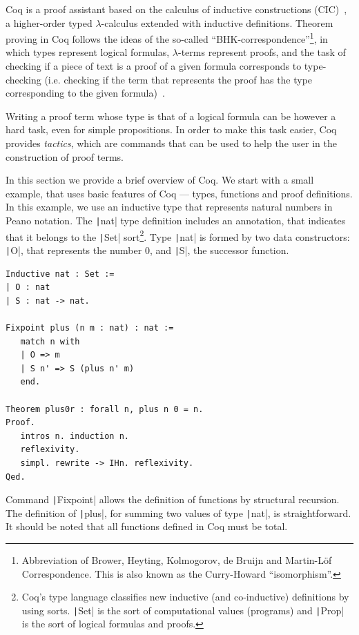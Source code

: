 \documentclass[review]{elsarticle}
\newcommand{\coq}[1]{\texttt|#1|}
\theoremstyle{definition}
\begin{document}
Coq is a proof assistant based on the calculus of inductive
constructions (CIC)~\cite{Bertot2010}, a higher-order typed
$\lambda$-calculus extended with inductive definitions. Theorem
proving in Coq follows the ideas of the so-called
``BHK-correspondence''\footnote{Abbreviation of Brower, Heyting,
  Kolmogorov, de Bruijn and Martin-L\"of Correspondence. This is also
  known as the Curry-Howard ``isomorphism''.}, in which types represent
logical formulas, $\lambda$-terms represent proofs, and the task of
checking if a piece of text is a proof of a given formula corresponds
to type-checking (i.e. checking if the term that represents the proof
has the type corresponding to the given formula)~\cite{Sorensen2006}.

Writing a proof term whose type is that of a logical formula can be
however a hard task, even for simple propositions.  In order to make
this task easier, Coq provides \emph{tactics}, which are commands that
can be used to help the user in the construction of proof terms.

In this section we provide a brief overview of Coq. We start with a
small example, that uses basic
features of Coq --- types, functions and proof definitions.  In this
example, we use an inductive type that represents natural numbers in
Peano notation. The \coq{nat} type definition includes an
annotation, that indicates that it belongs to the \coq{Set}
sort\footnote{Coq's type language classifies new inductive (and
  co-inductive) definitions by using sorts. \coq{Set} is the sort
  of computational values (programs) and \coq{Prop} is the sort of
  logical formulas and proofs.}. Type \coq{nat} is formed by two
data constructors: \coq{O}, that represents the number $0$, and \coq{S},
the successor function.
\begin{verbatim}
Inductive nat : Set :=
| O : nat
| S : nat -> nat.

Fixpoint plus (n m : nat) : nat :=
   match n with
   | O => m
   | S n' => S (plus n' m)
   end.

Theorem plus0r : forall n, plus n 0 = n.
Proof.
   intros n. induction n.
   reflexivity.
   simpl. rewrite -> IHn. reflexivity.
Qed.
\end{verbatim}   

Command \coq{Fixpoint} allows the definition of functions by
structural recursion. The definition of \coq{plus}, for summing two
values of type \coq{nat}, is straightforward. It should be noted
that all functions defined in Coq must be total.
\end{document}
